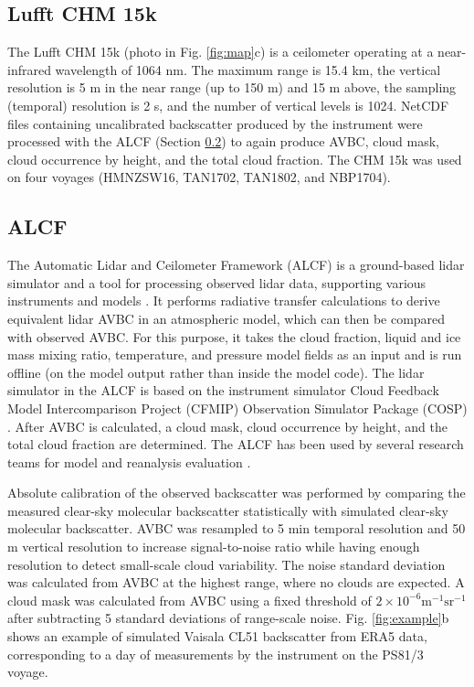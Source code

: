 \documentclass[12pt,a4paper]{article}
\begin{document}
\subsection{Lufft CHM 15k}
\label{sec:chm15k}

The Lufft CHM 15k (photo in Fig. \ref{fig:map}c) is a ceilometer operating at a
near-infrared wavelength of 1064 nm. The maximum range is 15.4 km, the vertical
resolution is 5 m in the near range (up to 150 m) and 15 m above, the sampling
(temporal) resolution is 2 s, and the number of vertical levels is 1024.
NetCDF files containing uncalibrated backscatter produced by the instrument
were processed with the ALCF (Section \ref{sec:alcf}) to again produce AVBC, cloud
mask, cloud occurrence by height, and the total cloud fraction. The CHM 15k was
used on four voyages (HMNZSW16, TAN1702, TAN1802, and NBP1704).

\subsection{ALCF}
\label{sec:alcf}

The Automatic Lidar and Ceilometer Framework (ALCF) is a ground-based lidar
simulator and a tool for processing observed lidar data, supporting various
instruments and models \citep{kuma2021}. It performs radiative transfer
calculations to derive equivalent lidar AVBC in an atmospheric model, which can
then be compared with observed AVBC. For this purpose, it takes the cloud fraction, liquid and ice mass mixing ratio, temperature, and
pressure model fields as an input and is run offline (on the model output rather than
inside the model code). The lidar simulator in the ALCF is based on the
instrument simulator Cloud Feedback Model Intercomparison Project (CFMIP)
Observation Simulator Package (COSP) \citep{bodas-salcedo2011}.  After AVBC is
calculated, a cloud mask, cloud occurrence by height, and the total cloud
fraction are determined. The ALCF has been used by several research teams for
model and reanalysis evaluation
\citep{kuma2020,kremser2021,guyot2022,pei2023,whitehead2023,mcdonald2024}.

Absolute calibration of the observed backscatter was performed by comparing the
measured clear-sky molecular backscatter statistically with simulated clear-sky
molecular backscatter. AVBC was resampled to 5 min temporal resolution and 50 m
vertical resolution to increase signal-to-noise ratio while having enough
resolution to detect small-scale cloud variability. The noise standard
deviation was calculated from AVBC at the highest range, where no clouds are
expected.  A cloud mask was calculated from AVBC using a fixed threshold of
$\mathrm{2\times 10^{-6} m^{-1}sr^{-1}}$ after subtracting 5 standard
deviations of range-scale noise. Fig. \ref{fig:example}b shows an example of
simulated Vaisala CL51 backscatter from ERA5 data, corresponding to a day of
measurements by the instrument on the PS81/3 voyage.
\end{document}
